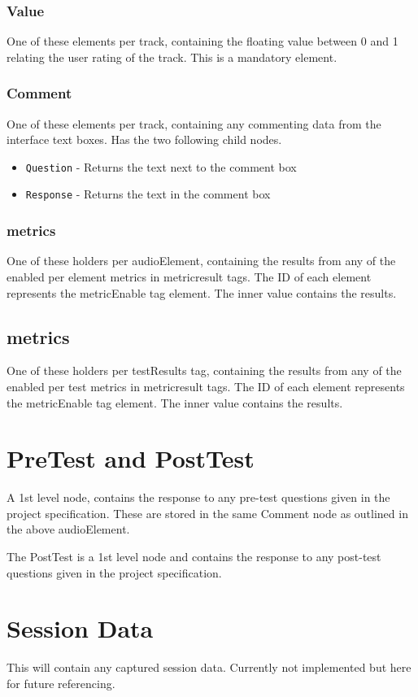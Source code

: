 \documentclass{article}
\begin{document}
\subsubsection{Value}
One of these elements per track, containing the floating value between 0 and 1 relating the user rating of the track. This is a mandatory element.

\subsubsection{Comment}
One of these elements per track, containing any commenting data from the interface text boxes. Has the two following child nodes.
\begin{itemize}
\item \texttt{Question} - Returns the text next to the comment box
\item \texttt{Response} - Returns the text in the comment box
\end{itemize}

\subsubsection{metrics}
One of these holders per audioElement, containing the results from any of the enabled per element metrics in metricresult tags. The ID of each element represents the metricEnable tag element. The inner value contains the results.


\subsection{metrics}
One of these holders per testResults tag, containing the results from any of the enabled per test metrics in metricresult tags. The ID of each element represents the metricEnable tag element. The inner value contains the results.


\section{PreTest and PostTest}
A 1st level node, contains the response to any pre-test questions given in the project specification. These are stored in the same Comment node as outlined in the above audioElement.

The PostTest is a 1st level node and contains the response to any post-test questions given in the project specification.

\section{Session Data}
This will contain any captured session data. Currently not implemented but here for future referencing.
\end{document}

